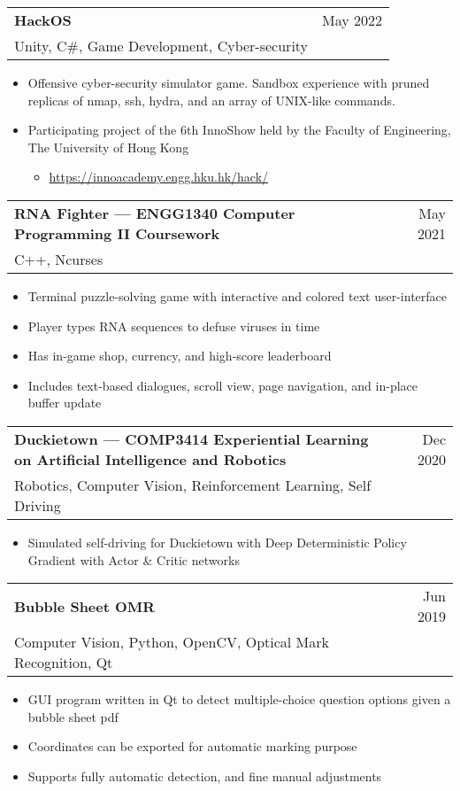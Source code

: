 \documentclass{article}
\makeatletter
\newcommand{\jobTitle}[3]{
    \vspace{0.3cm}
    \begin{tabular*}{1\textwidth}{||l@{\extracolsep{\fill}}r}
        \textbf{#1} & #2\\
        #3 &
    \end{tabular*}
}
\makeatother
\begin{document}
\jobTitle
{HackOS}
{May 2022}
{Unity, C\#, Game Development, Cyber-security}
\begin{itemize}
    \item Offensive cyber-security simulator game. Sandbox experience with pruned replicas of nmap, ssh, hydra, and an array of UNIX-like commands.
    \item Participating project of the 6th InnoShow held by the Faculty of Engineering, The University of Hong Kong
    \begin{itemize}
        \item \href{https://innoacademy.engg.hku.hk/hack/}{https://innoacademy.engg.hku.hk/hack/}
    \end{itemize}
\end{itemize}

\jobTitle
{RNA Fighter --- ENGG1340 Computer Programming II Coursework}
{May 2021}
{C++, Ncurses}
\begin{itemize}
    \item Terminal puzzle-solving game with interactive and colored text user-interface
    \item Player types RNA sequences to defuse viruses in time
	\item Has in-game shop, currency, and high-score leaderboard
	\item Includes text-based dialogues, scroll view, page navigation, and in-place buffer update
\end{itemize}

\jobTitle
{Duckietown --- COMP3414 Experiential Learning on Artificial Intelligence and Robotics}
{Dec 2020}
{Robotics, Computer Vision, Reinforcement Learning, Self Driving}
\begin{itemize}
    \item Simulated self-driving for Duckietown with Deep Deterministic Policy Gradient with Actor \& Critic networks
\end{itemize}

\jobTitle
{Bubble Sheet OMR}
{Jun 2019}
{Computer Vision, Python, OpenCV, Optical Mark Recognition, Qt}
\begin{itemize}
    \item GUI program written in Qt to detect multiple-choice question options given a bubble sheet pdf
    \item Coordinates can be exported for automatic marking purpose
    \item Supports fully automatic detection, and fine manual adjustments
\end{itemize}
\end{document}
